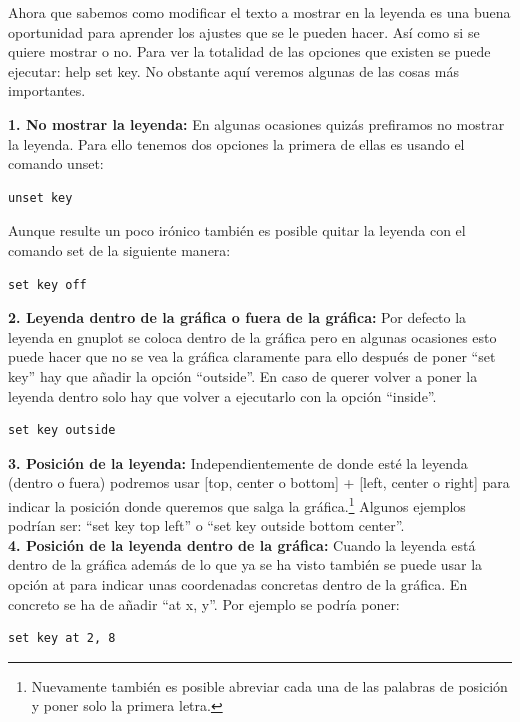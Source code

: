 \documentclass[11pt,a4paper,twoside,pdf]{article}
\numberwithin{equation}{section}
\begin{document}
Ahora que sabemos como modificar el texto a mostrar en la leyenda es una buena oportunidad para aprender los ajustes que se le pueden hacer. Así como si se quiere mostrar o no. Para ver la totalidad de las opciones que existen se puede ejecutar: help set key. No obstante aquí veremos algunas de las cosas más importantes.

\textbf{1. No mostrar la leyenda:} En algunas ocasiones quizás prefiramos no mostrar la leyenda. Para ello tenemos dos opciones la primera de ellas es usando el comando unset:

\begin{lstlisting}[language=Gnuplot]
unset key
\end{lstlisting}

Aunque resulte un poco irónico también es posible quitar la leyenda con el comando set de la siguiente manera:

\begin{lstlisting}[language=Gnuplot]
set key off
\end{lstlisting}

\textbf{2. Leyenda dentro de la gráfica o fuera de la gráfica:} Por defecto la leyenda en gnuplot se coloca dentro de la gráfica pero en algunas ocasiones esto puede hacer que no se vea la gráfica claramente para ello después de poner ``set key'' hay que añadir la opción ``outside''. En caso de querer volver a poner la leyenda dentro solo hay que volver a ejecutarlo con la opción ``inside''.

\begin{lstlisting}[language=Gnuplot]
set key outside
\end{lstlisting}

\textbf{3. Posición de la leyenda:} Independientemente de donde esté la leyenda (dentro o fuera) podremos usar [top, center o bottom] + [left, center o right] para indicar la posición donde queremos que salga la gráfica.\footnote{Nuevamente también es posible abreviar cada una de las palabras de posición y poner solo la primera letra.} Algunos ejemplos podrían ser: ``set key top left'' o ``set key outside bottom center''.\\

\textbf{4. Posición de la leyenda dentro de la gráfica:} Cuando la leyenda está dentro de la gráfica además de lo que ya se ha visto también se puede usar la opción at para indicar unas coordenadas concretas dentro de la gráfica. En concreto se ha de añadir ``at x, y''. Por ejemplo se podría poner:

\begin{lstlisting}[language=Gnuplot]
set key at 2, 8
\end{lstlisting}
\end{document}
